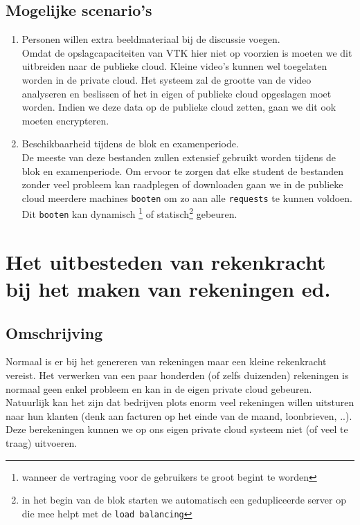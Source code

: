 \documentclass{article}
\begin{document}
\subsection{Mogelijke scenario's}
\begin{enumerate}
    \item Personen willen extra beeldmateriaal bij de discussie voegen. \\
    
Omdat de opslagcapaciteiten van VTK hier niet op voorzien is moeten we dit uitbreiden naar de publieke cloud.  Kleine video's kunnen wel toegelaten worden in de private cloud. 
Het systeem zal de grootte van de video analyseren en beslissen of het in eigen of publieke cloud opgeslagen moet worden.  Indien we deze data op de publieke cloud zetten, gaan we dit ook moeten encrypteren.
    
    \item Beschikbaarheid tijdens de blok en examenperiode. \\

De meeste van deze bestanden zullen extensief gebruikt worden tijdens de blok en examenperiode.
Om ervoor te zorgen dat elke student de bestanden zonder veel probleem kan raadplegen of downloaden gaan we in de publieke cloud meerdere machines \texttt{booten} om zo aan alle \texttt{requests} te kunnen voldoen.
Dit \texttt{booten} kan dynamisch \footnote{wanneer de vertraging voor de gebruikers te groot begint te worden} of statisch\footnote{in het begin van de blok starten we automatisch een gedupliceerde server op die mee helpt met de \texttt{load balancing}} gebeuren. 
\end{enumerate}

\newpage

\section{Het uitbesteden van rekenkracht bij het maken van rekeningen ed.}
\subsection{Omschrijving}
Normaal is er bij het genereren van rekeningen maar een kleine rekenkracht vereist.  Het verwerken van een paar honderden (of zelfs duizenden) rekeningen is normaal geen enkel probleem en kan in de eigen private cloud gebeuren. Natuurlijk kan het zijn dat bedrijven plots enorm veel rekeningen willen uitsturen naar hun klanten (denk aan facturen op het einde van de maand, loonbrieven, ..).  Deze berekeningen kunnen we op ons eigen private cloud systeem niet (of veel te traag) uitvoeren.  \\
\end{document}
